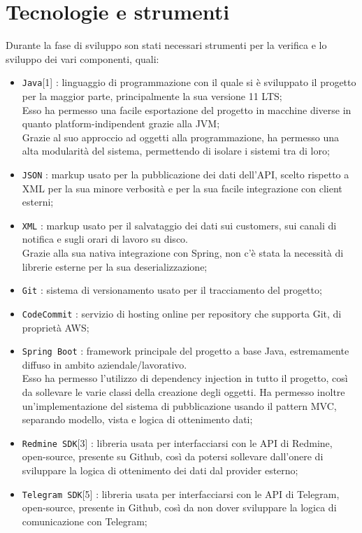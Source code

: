 \section{Tecnologie e strumenti}
    Durante la fase di sviluppo son stati necessari strumenti per la verifica e lo sviluppo dei vari componenti, quali:
    \begin{itemize}
    	\item \texttt{Java}[1] : linguaggio di programmazione con il quale si è sviluppato il progetto per la maggior parte, principalmente la sua versione 11 LTS; \\
    	Esso ha permesso una facile esportazione del progetto in macchine diverse in quanto platform-indipendent grazie alla JVM; \\
    	Grazie al suo approccio ad oggetti alla programmazione, ha permesso una alta modularità del sistema, permettendo di isolare i sistemi tra di loro;
    	\item \texttt{JSON} : markup usato per la pubblicazione dei dati dell'API, scelto rispetto a XML per la sua minore verbosità e per la sua facile integrazione con client esterni;
    	\item \texttt{XML} : markup usato per il salvataggio dei dati sui customers, sui canali di notifica e sugli orari di lavoro su disco. \\
    	Grazie alla sua nativa integrazione con Spring, non c'è stata la necessità di librerie esterne per la sua deserializzazione;
    	\item \texttt{Git} : sistema di versionamento usato per il tracciamento del progetto;
    	\item \texttt{CodeCommit} : servizio di hosting online per repository che supporta Git, di proprietà AWS;
    	\item \texttt{Spring Boot} : framework principale del progetto a base Java, estremamente diffuso in ambito aziendale/lavorativo. \\
    	Esso ha permesso l'utilizzo di dependency injection in tutto il progetto, così da sollevare le varie classi della creazione degli oggetti. Ha permesso inoltre un'implementazione del sistema di pubblicazione usando  il pattern MVC, separando modello, vista e logica di ottenimento dati;
    	\item \texttt{Redmine SDK}[3] : libreria usata per interfacciarsi con le API di Redmine, open-source, presente su Github, così da potersi sollevare dall'onere di sviluppare la logica di ottenimento dei dati dal provider esterno;
    	\item \texttt{Telegram SDK}[5] : libreria usata per interfacciarsi con le API di Telegram, open-source, presente in Github, così da non dover sviluppare la logica di comunicazione con Telegram;

\end{itemize}
